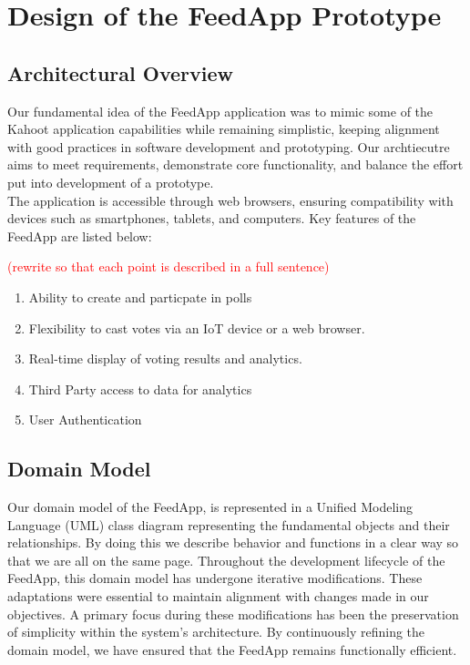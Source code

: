 \clearpage
\section{Design of the FeedApp Prototype}
\label{sec:design}

\subsection{Architectural Overview} 

Our fundamental idea of the FeedApp application was to mimic some of the Kahoot application capabilities while remaining simplistic, keeping alignment with good practices in software development and prototyping.  Our archtiecutre aims to meet requirements, demonstrate core functionality, and balance the effort put into development of a prototype.  \\

\noindent The application is accessible through web browsers, ensuring compatibility with devices such as smartphones, tablets, and computers.  Key features of the FeedApp are listed below:

\textcolor{red}{(rewrite so that each point is described in a full sentence)}

\begin{enumerate}
\item Ability to create and particpate in polls
\item Flexibility to cast votes via an IoT device or a web browser. 
\item Real-time display of voting results and analytics.
\item Third Party access to data for analytics
\item User Authentication
\end{enumerate}

\subsection{Domain Model} 

Our domain model of the FeedApp, is represented in a Unified Modeling Language (UML) class diagram representing the fundamental objects and their relationships. By doing this we describe  behavior and functions in a clear way so that we are all on the same page.  Throughout the development lifecycle of the FeedApp, this domain model has undergone iterative modifications. These adaptations were essential to maintain alignment with changes made in our objectives.  A primary focus during these modifications has been the preservation of simplicity within the system's architecture. By continuously refining the domain model, we have ensured that the FeedApp remains functionally efficient.

